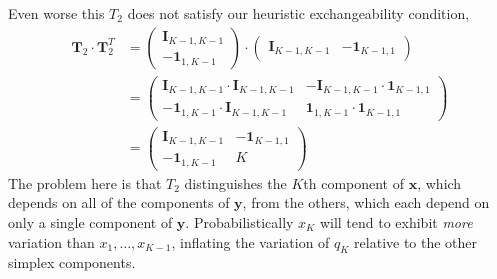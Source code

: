 \documentclass[
  letterpaper,
  DIV=11,
  numbers=noendperiod]{scrartcl}
\begin{document}
Even worse this \(T_{2}\) does not satisfy our heuristic exchangeability
condition, \begin{align*}
\mathbf{T}_{2} \cdot \mathbf{T}_{2}^{T}
&=
\begin{pmatrix}
\mathbf{I}_{K - 1, K - 1} \\
-\mathbf{1}_{1, K - 1}
\end{pmatrix}
\cdot
\begin{pmatrix}
\mathbf{I}_{K - 1, K - 1} &
-\mathbf{1}_{K - 1, 1}
\end{pmatrix}
\\
&=
\begin{pmatrix}
\mathbf{I}_{K - 1, K - 1} \cdot \mathbf{I}_{K - 1, K - 1} &
-\mathbf{I}_{K - 1, K - 1} \cdot \mathbf{1}_{K - 1, 1} \\
-\mathbf{1}_{1, K - 1} \cdot \mathbf{I}_{K - 1, K - 1} &
\mathbf{1}_{1, K - 1} \cdot \mathbf{1}_{K - 1, 1}
\end{pmatrix}
\\
&=
\begin{pmatrix}
\mathbf{I}_{K - 1, K - 1} &
-\mathbf{1}_{K - 1, 1} \\
-\mathbf{1}_{1, K - 1} &
K
\end{pmatrix}
\end{align*} The problem here is that \(T_{2}\) distinguishes the
\(K\)th component of \(\mathbf{x}\), which depends on all of the
components of \(\mathbf{y}\), from the others, which each depend on only
a single component of \(\mathbf{y}\). Probabilistically \(x_{K}\) will
tend to exhibit \emph{more} variation than \(x_{1}, \ldots, x_{K - 1}\),
inflating the variation of \(q_{K}\) relative to the other simplex
components.
\end{document}
